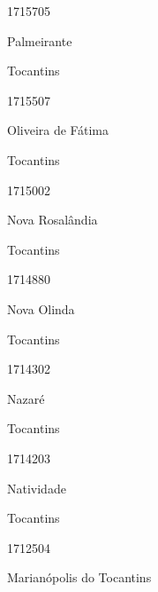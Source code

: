 \documentclass[
  letterpaper,
]{report}
\begin{document}
1715705

\n      

Palmeirante

\n    

\n    

\n      

Tocantins

\n      

1715507

\n      

Oliveira de Fátima

\n    

\n    

\n      

Tocantins

\n      

1715002

\n      

Nova Rosalândia

\n    

\n    

\n      

Tocantins

\n      

1714880

\n      

Nova Olinda

\n    

\n    

\n      

Tocantins

\n      

1714302

\n      

Nazaré

\n    

\n    

\n      

Tocantins

\n      

1714203

\n      

Natividade

\n    

\n    

\n      

Tocantins

\n      

1712504

\n      

Marianópolis do Tocantins

\n    
\end{document}
